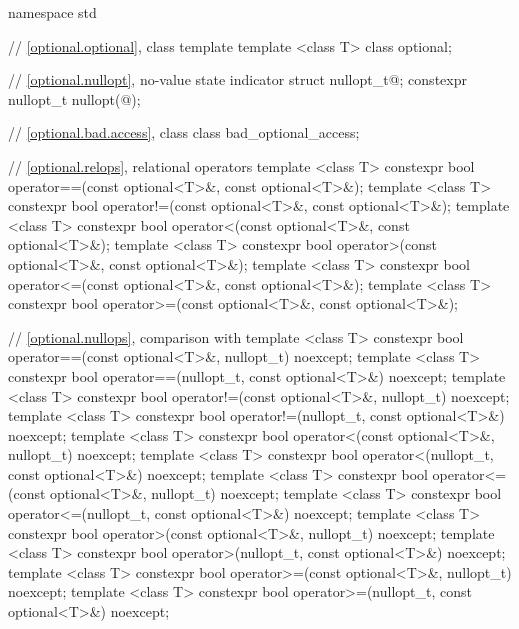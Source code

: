 %
%
\begin{codeblock}
namespace std {
  // \ref{optional.optional}, class template 
  template <class T>
    class optional;

  // \ref{optional.nullopt}, no-value state indicator
  struct nullopt_t{@\seebelow@};
  constexpr nullopt_t nullopt(@\unspec@);

  // \ref{optional.bad.access}, class 
  class bad_optional_access;

  // \ref{optional.relops}, relational operators
  template <class T>
  constexpr bool operator==(const optional<T>&, const optional<T>&);
  template <class T>
  constexpr bool operator!=(const optional<T>&, const optional<T>&);
  template <class T>
  constexpr bool operator<(const optional<T>&, const optional<T>&);
  template <class T>
  constexpr bool operator>(const optional<T>&, const optional<T>&);
  template <class T>
  constexpr bool operator<=(const optional<T>&, const optional<T>&);
  template <class T>
  constexpr bool operator>=(const optional<T>&, const optional<T>&);

  // \ref{optional.nullops}, comparison with 
  template <class T> constexpr bool operator==(const optional<T>&, nullopt_t) noexcept;
  template <class T> constexpr bool operator==(nullopt_t, const optional<T>&) noexcept;
  template <class T> constexpr bool operator!=(const optional<T>&, nullopt_t) noexcept;
  template <class T> constexpr bool operator!=(nullopt_t, const optional<T>&) noexcept;
  template <class T> constexpr bool operator<(const optional<T>&, nullopt_t) noexcept;
  template <class T> constexpr bool operator<(nullopt_t, const optional<T>&) noexcept;
  template <class T> constexpr bool operator<=(const optional<T>&, nullopt_t) noexcept;
  template <class T> constexpr bool operator<=(nullopt_t, const optional<T>&) noexcept;
  template <class T> constexpr bool operator>(const optional<T>&, nullopt_t) noexcept;
  template <class T> constexpr bool operator>(nullopt_t, const optional<T>&) noexcept;
  template <class T> constexpr bool operator>=(const optional<T>&, nullopt_t) noexcept;
  template <class T> constexpr bool operator>=(nullopt_t, const optional<T>&) noexcept;

}
\end{codeblock}

